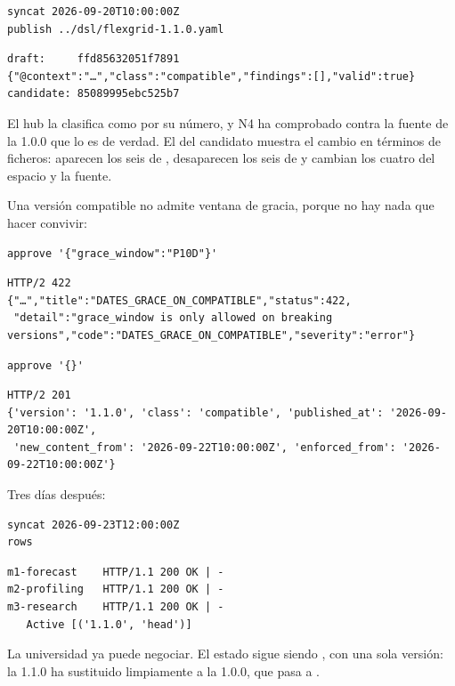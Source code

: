 \begin{lstlisting}[style=sh]
syncat 2026-09-20T10:00:00Z
publish ../dsl/flexgrid-1.1.0.yaml
\end{lstlisting}
\begin{lstlisting}[style=out]
draft:     ffd85632051f7891
{"@context":"…","class":"compatible","findings":[],"valid":true}
candidate: 85089995ebc525b7
\end{lstlisting}

El hub la clasifica como  por su número, y N4 ha comprobado contra la fuente de la 1.0.0 que lo
es de verdad. El  del candidato muestra el cambio en términos de ficheros: aparecen los seis de
, desaparecen los seis de  y cambian los cuatro del espacio y la
fuente.

Una versión compatible no admite ventana de gracia, porque no hay nada que hacer convivir:

\begin{lstlisting}[style=sh]
approve '{"grace_window":"P10D"}'
\end{lstlisting}
\begin{lstlisting}[style=out]
HTTP/2 422
{"…","title":"DATES_GRACE_ON_COMPATIBLE","status":422,
 "detail":"grace_window is only allowed on breaking versions","code":"DATES_GRACE_ON_COMPATIBLE","severity":"error"}
\end{lstlisting}

\begin{lstlisting}[style=sh]
approve '{}'
\end{lstlisting}
\begin{lstlisting}[style=out]
HTTP/2 201
{'version': '1.1.0', 'class': 'compatible', 'published_at': '2026-09-20T10:00:00Z',
 'new_content_from': '2026-09-22T10:00:00Z', 'enforced_from': '2026-09-22T10:00:00Z'}
\end{lstlisting}

Tres días después:

\begin{lstlisting}[style=sh]
syncat 2026-09-23T12:00:00Z
rows
\end{lstlisting}
\begin{lstlisting}[style=out]
m1-forecast    HTTP/1.1 200 OK | -
m2-profiling   HTTP/1.1 200 OK | -
m3-research    HTTP/1.1 200 OK | -
   Active [('1.1.0', 'head')]
\end{lstlisting}

La universidad ya puede negociar. El estado sigue siendo , con una sola versión: la 1.1.0 ha
sustituido limpiamente a la 1.0.0, que pasa a .

